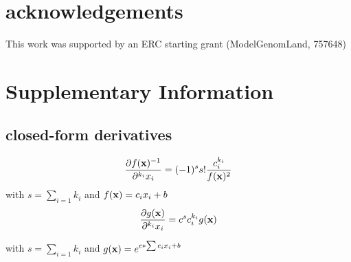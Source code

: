 \documentclass[10pt, a4]{article}
\newcommand{\beginsupplement}{%
        \setcounter{table}{0}
        \renewcommand{\thetable}{S\arabic{table}}%
        \setcounter{figure}{0}
        \renewcommand{\thefigure}{S\arabic{figure}}%
     }
\begin{document}
\section*{acknowledgements}
This work was supported by an ERC starting grant (ModelGenomLand, 757648)


\beginsupplement

\section*{Supplementary Information}
\subsection*{closed-form derivatives}

\begin{equation}
\frac{\partial f(\bold{x})^{-1}}{\partial^{k_i} x_i} = (-1)^s s! \frac{c^{k_i}_i}{f(\bold{x})^2}
\end{equation}
with $s = \sum_{i=1} k_i$ and $f(\bold{x}) = c_i x_i + b$
%
\begin{equation}
\frac{\partial g(\bold{x})}{\partial^{k_i} x_i} = c^sc_i^{k_i}g(\bold{x})	
\end{equation}

with $s = \sum_{i=1} k_i$ and $g(\bold{x}) = e^{c*\sum c_i x_i + b}$

\end{document}
